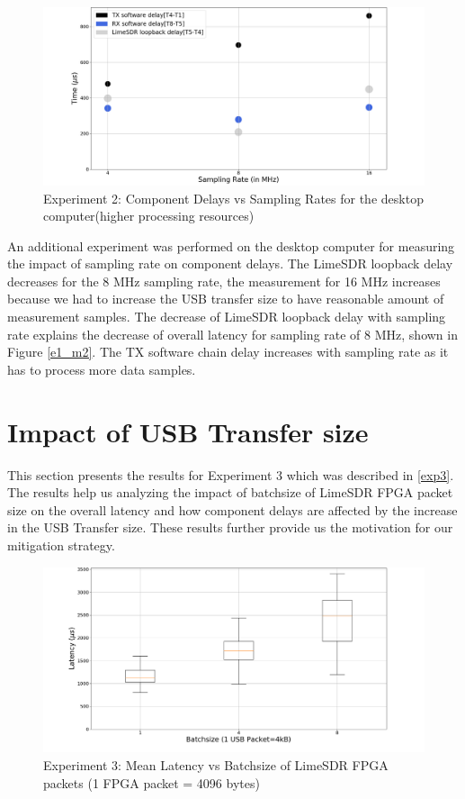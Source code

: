 \begin{figure}[h!]
\centering
\includegraphics[width=\textwidth]{Thesis/Figure/E2_M2_2.png}
\caption{Experiment 2: Component Delays vs Sampling Rates for the desktop computer(higher processing resources)}
\label{e2_m2_1}
\end{figure}

An additional experiment was performed on the desktop computer for measuring the impact of sampling rate on component delays.
The LimeSDR loopback delay decreases for the 8 MHz sampling rate, the measurement for 16 MHz increases because we had to increase the USB transfer size to have reasonable amount of measurement samples.
The decrease of LimeSDR loopback delay with sampling rate explains the decrease of overall latency for sampling rate of 8 MHz, shown in Figure \ref{e1_m2}.
The TX software chain delay increases with sampling rate as it has to process more data samples.

\section{Impact of USB Transfer size} \label{ex3:results}
This section presents the results for Experiment 3 which was described in \ref{exp3}.
The results help us analyzing the impact of batchsize of LimeSDR FPGA packet size on the overall latency and how component delays are affected by the increase in the USB Transfer size.
These results further provide us the motivation for our mitigation strategy.\\

\begin{figure}[h!]
\centering
\includegraphics[width=\textwidth]{Thesis/Figure/E3M2-1.png}
\caption{Experiment 3: Mean Latency vs Batchsize of LimeSDR FPGA packets (1 FPGA packet = 4096 bytes)}
\label{e3_1}
\end{figure}

